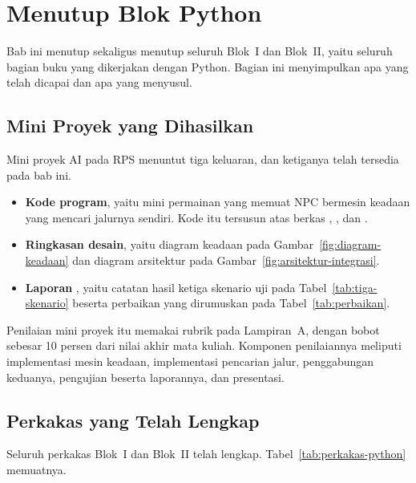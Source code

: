 \section{Menutup Blok Python}
\label{sec:menutup-blok-python}

Bab ini menutup  sekaligus menutup seluruh Blok~I dan Blok~II, yaitu
seluruh bagian buku yang dikerjakan dengan Python. Bagian ini menyimpulkan apa
yang telah dicapai dan apa yang menyusul.

\subsection{Mini Proyek yang Dihasilkan}

Mini proyek AI pada RPS menuntut tiga keluaran, dan ketiganya telah tersedia
pada bab ini.

\begin{itemize}
  \item \textbf{Kode program}, yaitu mini permainan yang memuat NPC bermesin
        keadaan yang mencari jalurnya sendiri. Kode itu tersusun atas berkas
        , , dan
        .
  \item \textbf{Ringkasan desain}, yaitu diagram keadaan pada
        Gambar~\ref{fig:diagram-keadaan} dan diagram arsitektur pada
        Gambar~\ref{fig:arsitektur-integrasi}.
  \item \textbf{Laporan }, yaitu catatan hasil ketiga
        skenario uji pada Tabel~\ref{tab:tiga-skenario} beserta perbaikan yang
        dirumuskan pada Tabel~\ref{tab:perbaikan}.
\end{itemize}

Penilaian mini proyek itu memakai rubrik pada Lampiran~A, dengan bobot
 sebesar 10 persen dari nilai akhir mata kuliah. Komponen penilaiannya
meliputi implementasi mesin keadaan, implementasi pencarian jalur, penggabungan
keduanya, pengujian beserta laporannya, dan presentasi.

\subsection{Perkakas yang Telah Lengkap}

Seluruh perkakas Blok~I dan Blok~II telah lengkap. Tabel~\ref{tab:perkakas-python}
memuatnya.

